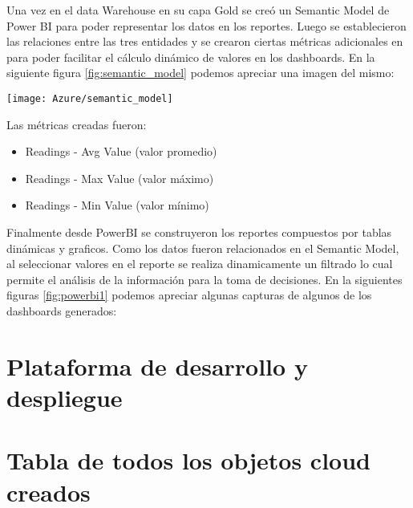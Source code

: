 Una vez en el data Warehouse en su capa Gold se creó un Semantic Model de Power BI para poder representar los datos en los reportes. Luego se establecieron las relaciones entre las tres entidades y se crearon ciertas métricas adicionales en para poder facilitar el cálculo dinámico de valores en los dashboards. En la siguiente figura \ref{fig:semantic_model} podemos apreciar una imagen del mismo:

\begin{center}
   \texttt{[image: Azure/semantic\_model]}
   \label{fig:semantic_model}
\end{center}

Las métricas creadas fueron:

\begin{itemize}
	\item Readings - Avg Value (valor promedio)
	\item Readings - Max Value (valor máximo)
	\item Readings - Min Value (valor mínimo)
\end{itemize}

Finalmente desde PowerBI se construyeron los reportes compuestos por tablas dinámicas y graficos. Como los datos fueron relacionados en el Semantic Model, al seleccionar valores en el reporte se realiza dinamicamente un filtrado lo cual permite el análisis de la información para la toma de decisiones. En la siguientes figuras \ref{fig:powerbi1} podemos apreciar algunas capturas de algunos de los dashboards generados:



\section{Plataforma de desarrollo y despliegue}



\section{Tabla de todos los objetos cloud creados}




